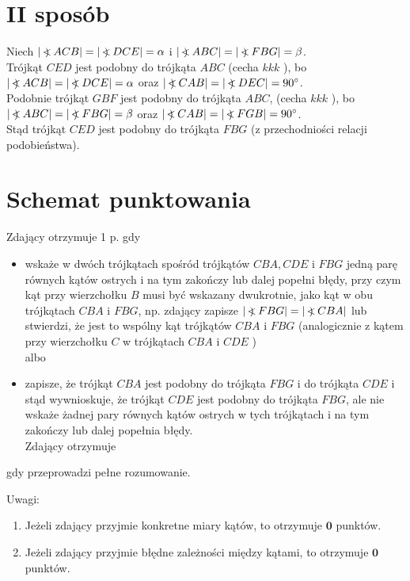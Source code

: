 \documentclass[10pt]{article}
\newcommand\Varangle{\mathop{{<\!\!\!\!\!\text{\small)}}\:}\nolimits}
\begin{document}
\section*{II sposób}
Niech $|\Varangle A C B|=|\Varangle D C E|=\alpha$ i $|\Varangle A B C|=|\Varangle F B G|=\beta$.\\
Trójkąt $C E D$ jest podobny do trójkąta $A B C$ (cecha $k k k$ ), bo $|\Varangle A C B|=|\Varangle D C E|=\alpha$ oraz $|\Varangle C A B|=|\Varangle D E C|=90^{\circ}$.\\
Podobnie trójkąt $G B F$ jest podobny do trójkąta $A B C$, (cecha $k k k$ ), bo $|\Varangle A B C|=|\Varangle F B G|=\beta$ oraz $|\Varangle C A B|=|\Varangle F G B|=90^{\circ}$.\\
Stąd trójkąt $C E D$ jest podobny do trójkąta $F B G$ (z przechodniości relacji podobieństwa).

\section*{Schemat punktowania}
Zdający otrzymuje 1 p. gdy

\begin{itemize}
  \item wskaże w dwóch trójkątach spośród trójkątów $C B A, C D E$ i $F B G$ jedną parę równych kątów ostrych i na tym zakończy lub dalej popełni błędy, przy czym kąt przy wierzchołku $B$ musi być wskazany dwukrotnie, jako kąt w obu trójkątach $C B A$ i $F B G$, np. zdający zapisze $|\Varangle F B G|=|\Varangle C B A|$ lub stwierdzi, że jest to wspólny kąt trójkątów $C B A$ i $F B G$ (analogicznie z kątem przy wierzchołku $C$ w trójkątach $C B A$ i $C D E$ )\\
albo
  \item zapisze, że trójkąt $C B A$ jest podobny do trójkąta $F B G$ i do trójkąta $C D E$ i stąd wywnioskuje, że trójkąt $C D E$ jest podobny do trójkąta $F B G$, ale nie wskaże żadnej pary równych kątów ostrych w tych trójkątach i na tym zakończy lub dalej popełnia błędy.\\
Zdający otrzymuje
\end{itemize}

gdy przeprowadzi pełne rozumowanie.

Uwagi:

\begin{enumerate}
  \item Jeżeli zdający przyjmie konkretne miary kątów, to otrzymuje $\mathbf{0}$ punktów.
  \item Jeżeli zdający przyjmie błędne zależności między kątami, to otrzymuje $\mathbf{0}$ punktów.
\end{enumerate}
\end{document}
